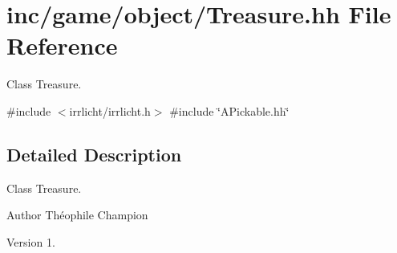 \hypertarget{Treasure_8hh}{}\section{inc/game/object/\+Treasure.hh File Reference}
\label{Treasure_8hh}


Class Treasure.  


{\ttfamily \#include $<$irrlicht/irrlicht.\+h$>$}\newline
{\ttfamily \#include \char`\"{}A\+Pickable.\+hh\char`\"{}}\newline


\subsection{Detailed Description}
Class Treasure. 

\begin{DoxyAuthor}{Author}
Théophile Champion 
\end{DoxyAuthor}
\begin{DoxyVersion}{Version}
1. 
\end{DoxyVersion}
